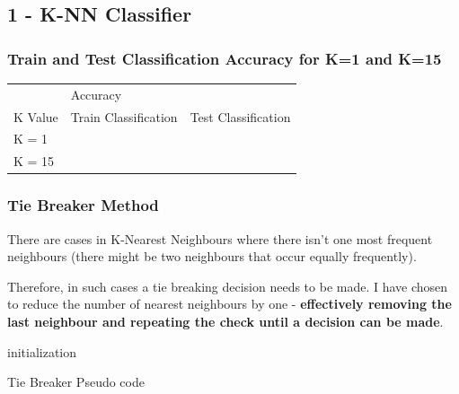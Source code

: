 \documentclass[10pt]{article}
\begin{document}
\subsection{1 -  K-NN Classifier}
\subsubsection{Train and Test Classification Accuracy for K=1 and K=15}

\begin{center}
\begin{tabular}{lll}
                             & Accuracy                                  &                                         \\ \cline{2-3} 
\multicolumn{1}{l|}{K Value} & \multicolumn{1}{l|}{Train Classification} & \multicolumn{1}{l|}{Test Classification} \\ \hline
\multicolumn{1}{|l|}{K = 1}  & \multicolumn{1}{l|}{}                     & \multicolumn{1}{l|}{}                    \\ \hline
\multicolumn{1}{|l|}{K = 15} & \multicolumn{1}{l|}{}                     & \multicolumn{1}{l|}{}                    \\ \hline
\end{tabular}
\end{center}

\subsubsection{Tie Breaker Method}

There are cases in K-Nearest Neighbours where there isn't one most frequent neighbours (there might be two neighbours that occur equally frequently). 

Therefore, in such cases a tie breaking decision needs to be made. I have chosen to reduce the number of nearest neighbours by one - \textbf{effectively removing the last neighbour and repeating the check until a decision can be made}.

\begin{algorithm}[H]
 initialization\;
 \caption{Tie Breaker Pseudo code}
\end{algorithm}
 
\end{document}
